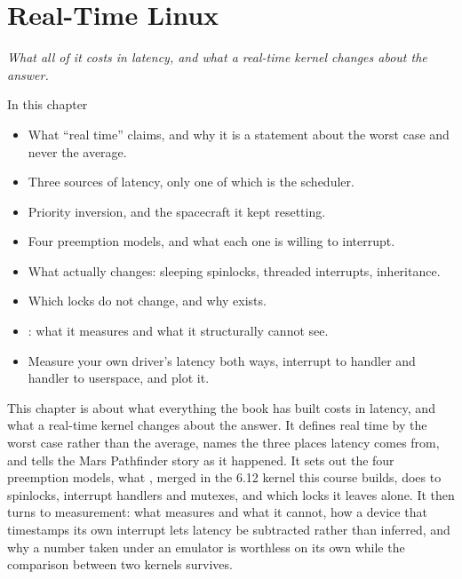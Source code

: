 
\chapter{Real-Time Linux}
\label{c12:ch}

{\large\itshape What all of it costs in latency, and what a real-time kernel changes about the
answer.\par}

\begin{chapterbox}{In this chapter}
\begin{itemize}
  \item What ``real time'' claims, and why it is a statement about the worst case and never the
    average.
  \item Three sources of latency, only one of which is the scheduler.
  \item Priority inversion, and the spacecraft it kept resetting.
  \item Four preemption models, and what each one is willing to interrupt.
  \item What  actually changes: sleeping spinlocks, threaded interrupts,
    inheritance.
  \item Which locks do not change, and why  exists.
  \item {}: what it measures and what it structurally cannot see.
  \item Measure your own driver's latency both ways, interrupt to handler and handler to
    userspace, and plot it.
\end{itemize}
\end{chapterbox}

This chapter is about what everything the book has built costs in latency, and what a real-time
kernel changes about the answer. It defines real time by the worst case rather than the average,
names the three places latency comes from, and tells the Mars Pathfinder story as it happened. It
sets out the four preemption models, what , merged in the 6.12 kernel this course
builds, does to spinlocks, interrupt handlers and mutexes, and which locks it leaves alone. It then
turns to measurement: what  measures and what it cannot, how a device that
timestamps its own interrupt lets latency be subtracted rather than inferred, and why a number taken
under an emulator is worthless on its own while the comparison between two kernels survives.

